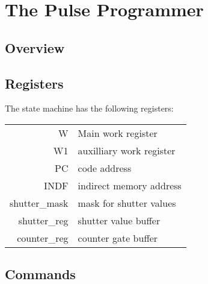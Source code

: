 \documentclass[12pt]{article}
\begin{document}
\section{The Pulse Programmer}
\subsection{Overview}

\subsection{Registers}
The state machine has the following registers:

\begin{tabular}{r l}
W & Main work register \\
W1 & auxilliary work register \\
PC & code address \\
INDF & indirect memory address \\
shutter\_mask & mask for shutter values \\
shutter\_reg & shutter value buffer \\
counter\_reg & counter gate buffer \\
\end{tabular}


\subsection{Commands}
\end{document}
